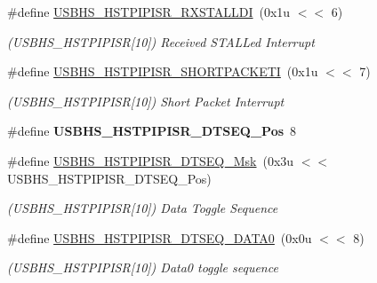 \begin{DoxyCompactItemize}
\#define \mbox{\hyperlink{group__SAMV71__USBHS_ga49bab8fafde4c709dd7decb1c97b0503}{U\+S\+B\+H\+S\+\_\+\+H\+S\+T\+P\+I\+P\+I\+S\+R\+\_\+\+R\+X\+S\+T\+A\+L\+L\+DI}}~(0x1u $<$$<$ 6)
\begin{DoxyCompactList}\small\item\em (U\+S\+B\+H\+S\+\_\+\+H\+S\+T\+P\+I\+P\+I\+SR\mbox{[}10\mbox{]}) Received S\+T\+A\+L\+Led Interrupt \end{DoxyCompactList}\item 
\mbox{\label{group__SAMV71__USBHS_ga24f69fdd9e7c0327a46178c23dffba8a}} 
\#define \mbox{\hyperlink{group__SAMV71__USBHS_ga24f69fdd9e7c0327a46178c23dffba8a}{U\+S\+B\+H\+S\+\_\+\+H\+S\+T\+P\+I\+P\+I\+S\+R\+\_\+\+S\+H\+O\+R\+T\+P\+A\+C\+K\+E\+TI}}~(0x1u $<$$<$ 7)
\begin{DoxyCompactList}\small\item\em (U\+S\+B\+H\+S\+\_\+\+H\+S\+T\+P\+I\+P\+I\+SR\mbox{[}10\mbox{]}) Short Packet Interrupt \end{DoxyCompactList}\item 
\mbox{\label{group__SAMV71__USBHS_ga12da3c3515367b9798455ca8ea4e2796}} 
\#define {\bfseries U\+S\+B\+H\+S\+\_\+\+H\+S\+T\+P\+I\+P\+I\+S\+R\+\_\+\+D\+T\+S\+E\+Q\+\_\+\+Pos}~8
\item 
\mbox{\label{group__SAMV71__USBHS_gaa48469a6762c93aca952ebafb652278f}} 
\#define \mbox{\hyperlink{group__SAMV71__USBHS_gaa48469a6762c93aca952ebafb652278f}{U\+S\+B\+H\+S\+\_\+\+H\+S\+T\+P\+I\+P\+I\+S\+R\+\_\+\+D\+T\+S\+E\+Q\+\_\+\+Msk}}~(0x3u $<$$<$ U\+S\+B\+H\+S\+\_\+\+H\+S\+T\+P\+I\+P\+I\+S\+R\+\_\+\+D\+T\+S\+E\+Q\+\_\+\+Pos)
\begin{DoxyCompactList}\small\item\em (U\+S\+B\+H\+S\+\_\+\+H\+S\+T\+P\+I\+P\+I\+SR\mbox{[}10\mbox{]}) Data Toggle Sequence \end{DoxyCompactList}\item 
\mbox{\label{group__SAMV71__USBHS_gaec96193aa502e7f2702f3165b1dd6ef7}} 
\#define \mbox{\hyperlink{group__SAMV71__USBHS_gaec96193aa502e7f2702f3165b1dd6ef7}{U\+S\+B\+H\+S\+\_\+\+H\+S\+T\+P\+I\+P\+I\+S\+R\+\_\+\+D\+T\+S\+E\+Q\+\_\+\+D\+A\+T\+A0}}~(0x0u $<$$<$ 8)
\begin{DoxyCompactList}\small\item\em (U\+S\+B\+H\+S\+\_\+\+H\+S\+T\+P\+I\+P\+I\+SR\mbox{[}10\mbox{]}) Data0 toggle sequence \end{DoxyCompactList}\item 

\end{DoxyCompactItemize}
